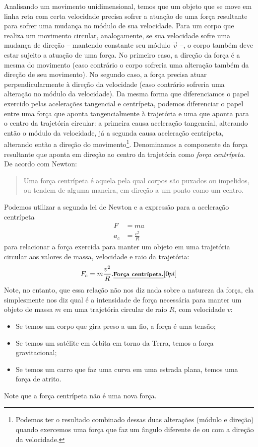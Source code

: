 Analisando um movimento unidimensional, temos que um objeto que se move em linha reta com certa velocidade precisa sofrer a atuação de uma força resultante para sofrer uma mudança no módulo de sua velocidade. Para um corpo que realiza um movimento circular, analogamente, se sua velocidade sofre uma mudança de direção -- mantendo constante seu módulo $\vec{v}$ --, o corpo também deve estar sujeito a atuação de uma força. No primeiro caso, a direção da força é a mesma do movimento (caso contrário o corpo sofreria uma alteração também da direção de seu movimento). No segundo caso, a força precisa atuar perpendicularmente à direção da velocidade (caso contrário sofreria uma alteração no módulo da velocidade). Da mesma forma que diferenciamos o papel exercido pelas acelerações tangencial e centrípeta, podemos diferenciar o papel entre uma força que aponta tangencialmente à trajetória e uma que aponta para o centro da trajetória circular: a primeira causa aceleração tangencial, alterando então o módulo da velocidade, já a segunda causa aceleração centrípeta, alterando então a direção do movimento\footnote{Podemos ter o resultado combinado dessas duas alterações (módulo e direção) quando exercemos uma força que faz um ângulo diferente de  ou  com a direção da velocidade.}. Denominamos a componente da força resultante que aponta em direção ao centro da trajetória como \emph{força centrípeta}. De acordo com Newton:
\begin{quote}
    Uma força centrípeta é aquela pela qual corpos são puxados ou impelidos, ou tendem de alguma maneira, em direção a um ponto como um centro.
\end{quote}

Podemos utilizar a segunda lei de Newton e a expressão para a aceleração centrípeta
\begin{align}
  F &= ma \\
  a_c &= \frac{v^2}{R}
\end{align}
%
para relacionar a força exercida para manter um objeto em uma trajetória circular aos valores de massa, velocidade e raio da trajetória:
\begin{equation}
  F_c = m \frac{v^2}{R}. \relax{\footnotesize\emph{\textbf{Força centrípeta.}}}[0pt]
\end{equation}
%
Note, no entanto, que essa relação não nos diz nada sobre a natureza da força, ela simplesmente nos diz qual é a intensidade de força necessária para manter um objeto de massa $m$ em uma trajetória circular de raio $R$, com velocidade $v$:
\begin{itemize}
    \item Se temos um corpo que gira preso a um fio, a força é uma tensão;
    \item Se temos um satélite em órbita em torno da Terra, temos a força gravitacional;
    \item Se temos um carro que faz uma curva em uma estrada plana, temos uma força de atrito.
\end{itemize}
%
Note que a força centrípeta não é uma nova força.


